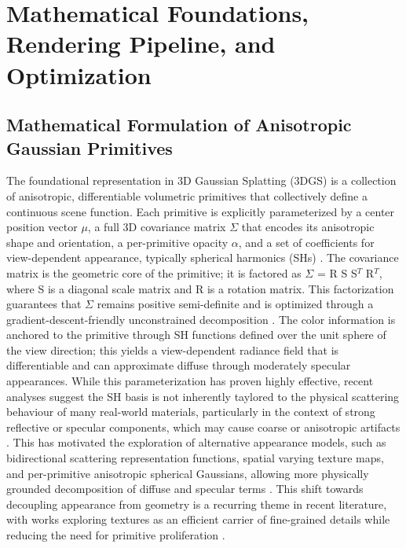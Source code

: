 \documentclass[11pt,a4paper]{article}
\begin{document}
\section{Mathematical Foundations, Rendering Pipeline, and Optimization}



\subsection{Mathematical Formulation of Anisotropic Gaussian Primitives}


The foundational representation in 3D Gaussian Splatting (3DGS) is a collection of anisotropic, differentiable volumetric primitives that collectively define a continuous scene function. Each primitive is explicitly parameterized by a center position vector $\mu$, a full 3D covariance matrix $\Sigma$ that encodes its anisotropic shape and orientation, a per-primitive opacity $\alpha$, and a set of coefficients for view-dependent appearance, typically spherical harmonics (SHs) \cite{arxiv:2407.17418v1,arxiv:2401.03890v2}. The covariance matrix is the geometric core of the primitive; it is factored as $\Sigma$ = R S S$^{T}$ R$^{T}$, where S is a diagonal scale matrix and R is a rotation matrix. This factorization guarantees that $\Sigma$ remains positive semi-definite and is optimized through a gradient-descent-friendly unconstrained decomposition \cite{arxiv:2510.18101v1,arxiv:2402.07181v1}. The color information is anchored to the primitive through SH functions defined over the unit sphere of the view direction; this yields a view-dependent radiance field that is differentiable and can approximate diffuse through moderately specular appearances. While this parameterization has proven highly effective, recent analyses suggest the SH basis is not inherently taylored to the physical scattering behaviour of many real-world materials, particularly in the context of strong reflective or specular components, which may cause coarse or anisotropic artifacts \cite{arxiv:2408.13370v1,arxiv:2506.13348v2}. This has motivated the exploration of alternative appearance models, such as bidirectional scattering representation functions, spatial varying texture maps, and per-primitive anisotropic spherical Gaussians, allowing more physically grounded decomposition of diffuse and specular terms \cite{arxiv:2408.13370v1,arxiv:2409.12954v1}. This shift towards decoupling appearance from geometry is a recurring theme in recent literature, with works exploring textures as an efficient carrier of fine-grained details while reducing the need for primitive proliferation \cite{arxiv:2409.12954v1,arxiv:2510.08491v2,arxiv:2412.12734v1}.
\end{document}

